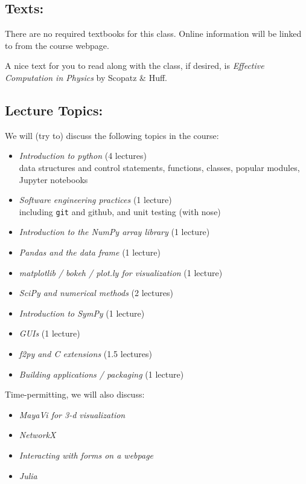 \documentclass[11pt]{article}
\newenvironment{itemsquish}
  { \begin{itemize}
    \addtolength{\itemsep}{-0.25\baselineskip}
    \addtolength{\baselineskip}{-0.25\baselineskip} }
  { \end{itemize} }
\begin{document}
\subsection*{Texts:}

There are no required textbooks for this class.  Online information
will be linked to from the course webpage.

A nice text for you to read along with the class, if desired, is
{\em Effective Computation in Physics}\/ by Scopatz \& Huff.



\subsection*{Lecture Topics:}

We will (try to) discuss the following topics in the course:
%
\begin{itemsquish}
\item {\em Introduction to python} (4 lectures) \\ data structures and
  control statements, functions, classes, popular modules, Jupyter
  notebooks

\item {\em Software engineering practices} (1 lecture) \\
  including {\tt git} and github, and unit testing (with nose)

\item {\em Introduction to the NumPy array library} (1 lecture)

\item {\em Pandas and the data frame} (1 lecture)

\item {\em matplotlib / bokeh / plot.ly for visualization} (1 lecture)

\item {\em SciPy and numerical methods} (2 lectures)

\item {\em Introduction to SymPy} (1 lecture)

\item {\em GUIs} (1 lecture)

\item {\em f2py and C extensions} (1.5 lectures)

\item {\em Building applications / packaging} (1 lecture)
\end{itemsquish}

\noindent Time-permitting, we will also discuss:
\begin{itemsquish}
\item {\em MayaVi for 3-d visualization}

\item {\em NetworkX}

\item {\em Interacting with forms on a webpage}

\item {\em Julia}
\end{itemsquish}
\end{document}
